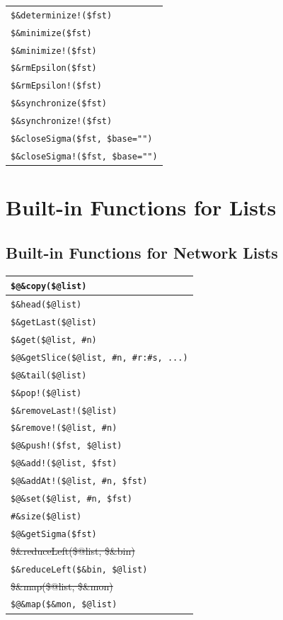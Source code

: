 \documentclass[letterpaper,12pt]{article}
\begin{document}
\begin{tabular}{|l|}
\verb/$&determinize!($fst)/ \\
\verb!$&minimize($fst)! \\
\verb/$&minimize!($fst)/ \\
\verb!$&rmEpsilon($fst)! \\
\verb/$&rmEpsilon!($fst)/ \\
\verb!$&synchronize($fst)! \\
\verb/$&synchronize!($fst)/ \\
\hline
\verb/$&closeSigma($fst, $base="")/\\
\verb/$&closeSigma!($fst, $base="")/\\
\hline
\end{tabular}

\newpage

\section{Built-in Functions for Lists}

\subsection{Built-in Functions for Network Lists}

\begin{tabular}{|l|}
\hline
\verb!$@&copy($@list)! \\
\hline
\verb!$&head($@list)! \\
\verb!$&getLast($@list)! \\
\verb!$&get($@list, #n)! \\
\verb!$@&getSlice($@list, #n, #r:#s, ...)! \\
\verb!$@&tail($@list)! \\
\hline
\verb+$&pop!($@list)+ \\
\verb+$&removeLast!($@list)+ \\
\verb+$&remove!($@list, #n)+ \\
\hline
\verb+$@&push!($fst, $@list)+ \\
\verb+$@&add!($@list, $fst)+ \\
\verb+$@&addAt!($@list, #n, $fst)+ \\
\hline
\verb!$@&set($@list, #n, $fst)! \\
\hline
\verb!#&size($@list)! \\
\verb!$@&getSigma($fst)! \\
\hline
\sout{\$\&reduceLeft(\$@list, \$\&bin)} \\
\verb!$&reduceLeft($&bin, $@list)! \\
\hline
\sout{\$\@\&map(\$@list, \$\&mon)} \\
\verb!$@&map($&mon, $@list)! \\
\hline
\end{tabular}
\end{document}
